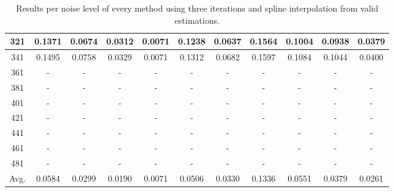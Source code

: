 \begin{table}[ht!]
\begin{tabular}{c|c|c|c|c|c|c|c|c|c|c}
321 & 0.1371 & 0.0674 & 0.0312 & 0.0071 & 0.1238 & 0.0637 & 0.1564 & 0.1004 & 0.0938 & 0.0379 \\ \hline
341 & 0.1495 & 0.0758 & 0.0329 & 0.0071 & 0.1312 & 0.0682 & 0.1597 & 0.1084 & 0.1044 & 0.0400 \\ \hline
361 & - & - & - & - & - & - & - & - & - & - \\ \hline
381 & - & - & - & - & - & - & - & - & - & - \\ \hline
401 & - & - & - & - & - & - & - & - & - & - \\ \hline
421 & - & - & - & - & - & - & - & - & - & - \\ \hline
441 & - & - & - & - & - & - & - & - & - & - \\ \hline
461 & - & - & - & - & - & - & - & - & - & - \\ \hline
481 & - & - & - & - & - & - & - & - & - & - \\ \hline
Avg.  & 0.0584 & 0.0299 & 0.0190 & 0.0071 & 0.0506 & 0.0330 & 0.1336 & 0.0551 & 0.0379 & 0.0261 \\ \hline
\end{tabular}
\caption{Results per noise level of every method using three iterations and spline interpolation from valid estimations.}
\label{tab:3itSperNoiseValid}
\end{table}


